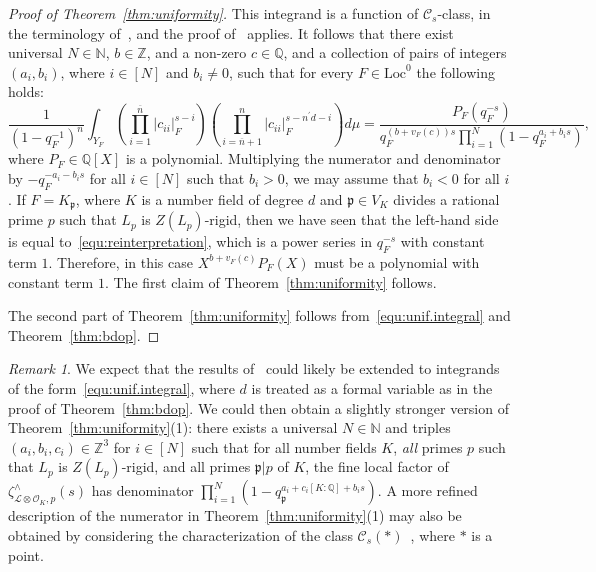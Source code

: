 \documentclass[11pt,a4paper]{amsart}
\theoremstyle{plain}
\theoremstyle{remark}
\newtheorem{rem}[thm]{Remark}
\newcommand{\N}{\mathbb{N}}
\newcommand{\Z}{\mathbb{Z}}
\newcommand{\Q}{\mathbb{Q}}
\newcommand{\tensor}{\otimes}
\newcommand{\p}{\mathfrak{p}}
\newcommand{\dimL}{n}
\def \p {\ensuremath{\mathfrak{p}}}
\begin{document}
\begin{proof}[Proof of Theorem~\ref{thm:uniformity}]
This integrand is a function of $\mathcal{C}_s$-class, in the terminology of~\cite[\S4.5]{CluckersHalupczok/18}, and the proof of~\cite[Corollary~4.5.2]{CluckersHalupczok/18} applies.  It follows that there exist universal $N \in \N$, $b \in \Z$, and a non-zero $c \in \Q$, and a collection of pairs of integers $(a_i, b_i)$, where $i \in [N]$ and $b_i \neq 0$, such that for every $F \in \mathrm{Loc}^0$ the following holds:
\begin{equation*} \label{equ:cluck.halup}
\frac{1}{(1 - q_F^{-1})^\dimL} \int_{Y_F} \left( \prod_{i = 1}^{\overline{\dimL}} |c_{ii}|_F^{s-i} \right) \left( \prod_{i = \overline{\dimL} + 1}^{\dimL} |c_{ii}|_F^{s - \dimL^\prime d - i} \right) d \mu = 
 \frac{P_F (q_F^{-s})}{q_F^{(b + v_F(c))s} \prod_{i = 1}^N (1 - q_F^{a_i + b_i s})},
\end{equation*}
where $P_F \in \Q[X]$ is a polynomial.  Multiplying the numerator and denominator by $-q_F^{-a_i - b_is}$ for all $i \in [N]$ such that $b_i > 0$, we may assume that $b_i < 0$ for all $i$.
If $F = K_\p$, where $K$ is a number field of degree $d$ and $\p \in V_K$ divides a rational prime $p$ such that $L_p$ is $Z(L_p)$-rigid, then we have seen that the left-hand side is equal to~\eqref{equ:reinterpretation}, which is a power series in $q_F^{-s}$ with constant term $1$.  Therefore, in this case $X^{b + v_F(c)} P_F(X)$ must be a polynomial with constant term $1$.
The first claim of Theorem~\ref{thm:uniformity} follows.

The second part of Theorem~\ref{thm:uniformity} follows from~\eqref{equ:unif.integral} and  Theorem~\ref{thm:bdop}.  
\end{proof}

\begin{rem} \label{rem:variants}
We expect that the results of~\cite[\S4.5]{CluckersHalupczok/18} could likely be extended to integrands of the form~\eqref{equ:unif.integral}, where $d$ is treated as a formal variable as in the proof of Theorem~\ref{thm:bdop}.  
We could then obtain a slightly stronger version of Theorem~\ref{thm:uniformity}(1):  there exists a universal $N \in \N$ and triples $(a_i, b_i, c_i) \in \Z^3$ for $i \in [N]$ such that for all number fields $K$, \emph{all} primes $p$ such that $L_p$ is $Z(L_p)$-rigid, and all primes $\p | p$ of $K$, the fine local factor of $ \zeta^\wedge_{\mathcal{L} \tensor \mathcal{O}_K, p}(s)$ has denominator $\prod_{i = 1}^N (1 - q_\p^{a_i + c_i [K:\Q] + b_i s})$.   A more refined description of the numerator in Theorem~\ref{thm:uniformity}(1) may also be obtained by considering the characterization of the class $\mathcal{C}_s(\ast)$~\cite[\S4.5]{CluckersHalupczok/18}, where $\ast$ is a point.
\end{rem}
\end{document}
